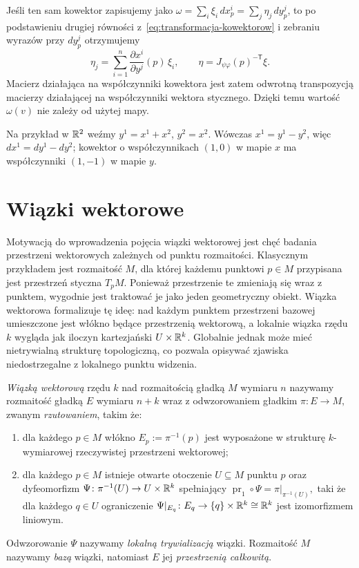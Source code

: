 Jeśli ten sam kowektor zapisujemy jako
$\omega=\sum_i\xi_i\,dx^i_p=\sum_j\eta_j\,dy^j_p$,
to po podstawieniu drugiej równości z~\eqref{eq:transformacja-kowektorow}
i zebraniu wyrazów przy $dy^j_p$ otrzymujemy
\begin{equation}\label{eq:transformacja-wspolrzednych-kowektora}
\boxed{\quad
\eta_j=\sum_{i=1}^n\frac{\partial x^i}{\partial y^j}(p)\,\xi_i,
\qquad
\eta=J_{\psi\varphi}(p)^{-\mathsf T}\xi .
\quad}
\end{equation}
Macierz działająca na współczynniki kowektora jest zatem
odwrotną transpozycją macierzy działającej na współczynniki
wektora stycznego. Dzięki temu wartość $\omega(v)$ nie zależy
od użytej mapy.

Na przykład w $\mathbb{R}^2$ weźmy $y^1=x^1+x^2$, $y^2=x^2$.
Wówczas $x^1=y^1-y^2$, więc
$dx^1=dy^1-dy^2$; kowektor o współczynnikach $(1,0)$
w mapie $x$ ma współczynniki $(1,-1)$ w mapie $y$.

\section{Wiązki wektorowe}\label{sec:wiazki-wektorowe}
Motywacją do wprowadzenia pojęcia wiązki wektorowej jest chęć badania przestrzeni wektorowych zależnych od punktu rozmaitości. Klasycznym przykładem jest rozmaitość $M$, dla której każdemu punktowi $p \in M$ przypisana jest przestrzeń styczna $T_pM$. Ponieważ przestrzenie te zmieniają się wraz z punktem, wygodnie jest traktować je jako jeden geometryczny obiekt. Wiązka wektorowa formalizuje tę ideę: nad każdym punktem przestrzeni bazowej umieszczone jest włókno będące przestrzenią wektorową, a lokalnie wiązka rzędu $k$ wygląda jak iloczyn kartezjański $U \times \mathbb{R}^k$. Globalnie jednak może mieć nietrywialną strukturę topologiczną, co pozwala opisywać zjawiska niedostrzegalne z lokalnego punktu widzenia.
\begin{definicja}
\label{def:wiazka-wektorowa}
\emph{Wiązką wektorową} rzędu $k$ nad rozmaitością gładką $M$
wymiaru $n$ nazywamy rozmaitość gładką $E$ wymiaru $n+k$ wraz
z odwzorowaniem gładkim
$
\pi\colon E\to M,
$
zwanym \emph{rzutowaniem}, takim że:
\begin{enumerate}[label=(\roman*)]
\item dla każdego $p\in M$ włókno
$
E_p:=\pi^{-1}(p)
$
jest wyposażone w strukturę $k$-wymiarowej rzeczywistej przestrzeni
wektorowej;

\item dla każdego $p\in M$ istnieje otwarte otoczenie $U\subseteq M$
punktu $p$ oraz dyfeomorfizm
$
\Psi\colon \pi^{-1}(U)\to U\times\mathbb{R}^k
$
spełniający
$
\operatorname{pr}_1\circ\Psi
=
\pi|_{\pi^{-1}(U)},
$
taki że dla każdego $q\in U$ ograniczenie
$
\Psi|_{E_q}\colon E_q\to\{q\}\times\mathbb{R}^k\cong\mathbb{R}^k
$
jest izomorfizmem liniowym.
\end{enumerate}
Odwzorowanie $\Psi$ nazywamy \emph{lokalną trywializacją} wiązki.
Rozmaitość $M$ nazywamy \emph{bazą} wiązki, natomiast $E$ jej
\emph{przestrzenią całkowitą}.
\end{definicja}

